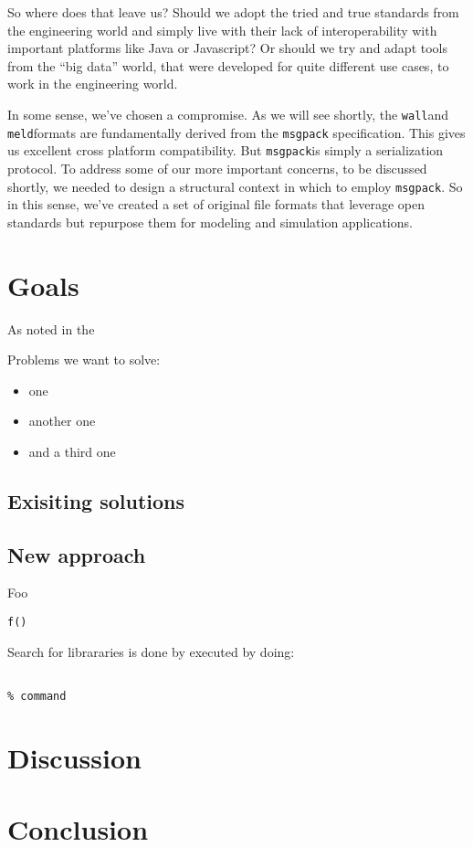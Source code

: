 \documentclass[11pt,a4paper,twocolumn]{article}
\newcommand{\wall}{\texttt{wall}}
\newcommand{\meld}{\texttt{meld}}
\newcommand{\msgpack}{\texttt{msgpack}}
\begin{document}
So where does that leave us?  Should we adopt the tried and true
standards from the engineering world and simply live with their lack
of interoperability with important platforms like Java or Javascript?
Or should we try and adapt tools from the ``big data'' world, that
were developed for quite different use cases, to work in the
engineering world.

In some sense, we've chosen a compromise.  As we will see shortly, the
\wall and \meld formats are fundamentally derived from the
\msgpack\cite{msgpack} specification.  This gives us excellent cross
platform compatibility.  But \msgpack is simply a serialization
protocol.  To address some of our more important concerns, to be
discussed shortly, we needed to design a structural context in which
to employ \msgpack. So in this sense, we've created a set of original
file formats that leverage open standards but repurpose them for
modeling and simulation applications.

\section{Goals}
\label{sec:background}

As noted in the 

Problems we want to solve:
\begin{itemize}
\item one
\item another one
\item and a third one
\end{itemize}

\subsection{Exisiting solutions}
\label{sec:exist-sol}

\subsection{New approach}
\label{sec:exist-sol}
Foo
\lstset{language=python}
\begin{lstlisting}[frame=single]  % Start your code-block
f()
\end{lstlisting}


Search for librararies is done by executed by doing:
\lstset{language=bash}
\begin{lstlisting}[frame=shadowbox]  % Start your code-block

% command
\end{lstlisting}

\section{Discussion}
\label{sec:discussion}

\section{Conclusion}
\label{sec:conclusion}


\end{document}
